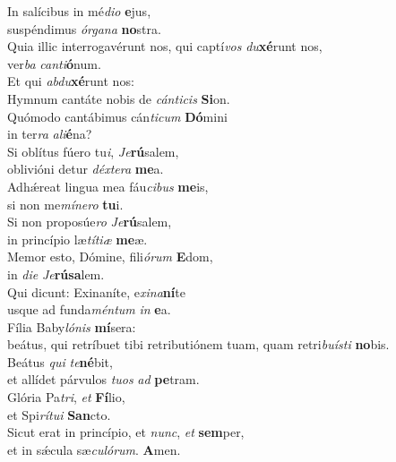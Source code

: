 \evenverse In salícibus in mé\textit{di}\textit{o} \textbf{e}jus,~\*\\
\evenverse suspéndimus \textit{ór}\textit{ga}\textit{na} \textbf{no}stra.\\
\oddverse Quia illic interrogavérunt nos, qui captí\textit{vos} \textit{du}\textbf{xé}runt nos,~\*\\
\oddverse ver\textit{ba} \textit{can}\textit{ti}\textbf{ó}num.\\
\evenverse Et qui \textit{ab}\textit{du}\textbf{xé}runt nos:~\*\\
\evenverse Hymnum cantáte nobis de \textit{cán}\textit{ti}\textit{cis} \textbf{Si}on.\\
\oddverse Quómodo cantábimus cán\textit{ti}\textit{cum} \textbf{Dó}mini~\*\\
\oddverse in ter\textit{ra} \textit{a}\textit{li}\textbf{é}na?\\
\evenverse Si oblítus fúero tu\textit{i}, \textit{Je}\textbf{rú}salem,~\*\\
\evenverse oblivióni detur \textit{déx}\textit{te}\textit{ra} \textbf{me}a.\\
\oddverse Adhǽreat lingua mea fáu\textit{ci}\textit{bus} \textbf{me}is,~\*\\
\oddverse si non me\textit{mí}\textit{ne}\textit{ro} \textbf{tu}i.\\
\evenverse Si non proposúe\textit{ro} \textit{Je}\textbf{rú}salem,~\*\\
\evenverse in princípio læ\textit{tí}\textit{ti}\textit{æ} \textbf{me}æ.\\
\oddverse Memor esto, Dómine, fili\textit{ó}\textit{rum} \textbf{E}dom,~\*\\
\oddverse in \textit{di}\textit{e} \textit{Je}\textbf{rú}\textbf{sa}lem.\\
\evenverse Qui dicunt: Exinaníte, e\textit{xi}\textit{na}\textbf{ní}te~\*\\
\evenverse usque ad funda\textit{mén}\textit{tum} \textit{in} \textbf{e}a.\\
\oddverse Fília Baby\textit{ló}\textit{nis} \textbf{mí}sera:~\*\\
\oddverse beátus, qui retríbuet tibi retributiónem tuam, quam retri\textit{bu}\textit{í}\textit{sti} \textbf{no}bis.\\
\evenverse Beátus \textit{qui} \textit{te}\textbf{né}bit,~\*\\
\evenverse et allídet párvulos \textit{tu}\textit{os} \textit{ad} \textbf{pe}tram.\\
\oddverse Glória Pa\textit{tri}, \textit{et} \textbf{Fí}lio,~\*\\
\oddverse et Spi\textit{rí}\textit{tu}\textit{i} \textbf{San}cto.\\
\evenverse Sicut erat in princípio, et \textit{nunc}, \textit{et} \textbf{sem}per,~\*\\
\evenverse et in sǽcula sæ\textit{cu}\textit{ló}\textit{rum}. \textbf{A}men.\\
